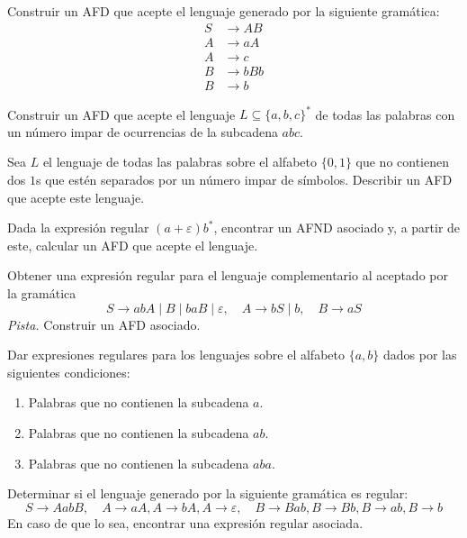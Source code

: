 \begin{ejercicio}
Construir un AFD que acepte el lenguaje generado por la siguiente gramática:
\begin{align*}
S &\to AB \\
A &\to aA \\
A &\to c \\
B &\to bBb \\
B &\to b
\end{align*}
\end{ejercicio}

\begin{ejercicio}
Construir un AFD que acepte el lenguaje $L \subseteq \{a, b, c\} ^*$ de todas las palabras con un número impar de ocurrencias de la subcadena $abc$.
\end{ejercicio}

\begin{ejercicio}
Sea $L$ el lenguaje de todas las palabras sobre el alfabeto $\{0, 1\}$ que no contienen dos $1$s que estén separados por un número impar de símbolos. Describir un AFD que acepte este lenguaje.
\end{ejercicio}

\begin{ejercicio}
Dada la expresión regular $(a + \varepsilon)b^*$, encontrar un AFND asociado y, a partir de este, calcular un AFD que acepte el lenguaje.
\end{ejercicio}

\begin{ejercicio}
Obtener una expresión regular para el lenguaje complementario al aceptado por la gramática
$$S \to abA \mid B \mid baB \mid \varepsilon, \quad A \to bS \mid b, \quad B \to aS$$
\textit{Pista.} Construir un AFD asociado.
\end{ejercicio}

\begin{ejercicio}
Dar expresiones regulares para los lenguajes sobre el alfabeto $\{a, b\}$ dados por las siguientes condiciones:
\begin{enumerate}
    \item Palabras que no contienen la subcadena $a$.
    \item Palabras que no contienen la subcadena $ab$.
    \item Palabras que no contienen la subcadena $aba$.
\end{enumerate}
\end{ejercicio}

\begin{ejercicio}
Determinar si el lenguaje generado por la siguiente gramática es regular:
$$S \to AabB, \quad A \to aA, A \to bA, A \to \varepsilon, \quad B \to Bab, B \to Bb, B \to ab, B \to b$$
En caso de que lo sea, encontrar una expresión regular asociada.
\end{ejercicio}

